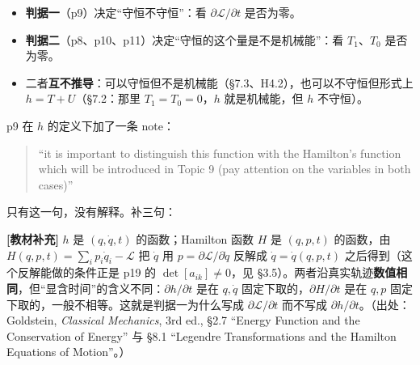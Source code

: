 \documentclass[11pt]{ctexart}
\begin{document}
\begin{itemize}
\item \textbf{判据一}（p9）决定“守恒不守恒”：看 $\partial\mathcal{L}/\partial t$ 是否为零。
\item \textbf{判据二}（p8、p10、p11）决定“守恒的这个量是不是机械能”：看 $T_1$、$T_0$ 是否为零。
\item 二者\textbf{互不推导}：可以守恒但不是机械能（§7.3、H4.2），也可以不守恒但形式上 $h=T+U$（§7.2：那里 $T_1=T_0=0$，$h$ 就是机械能，但 $h$ 不守恒）。
\end{itemize}



p9 在 $h$ 的定义下加了一条 note：
\begin{quote}
“it is important to distinguish this function with the Hamilton's function which will be introduced in Topic 9 (pay attention on the variables in both cases)”
\end{quote}
只有这一句，没有解释。补三句：

\textbf{[教材补充]} $h$ 是 $(q,\dot q,t)$ 的函数；Hamilton 函数 $H$ 是 $(q,p,t)$ 的函数，由 $H(q,p,t)=\sum_i p_i\dot q_i-\mathcal{L}$ 把 $\dot q$ 用 $p=\partial\mathcal{L}/\partial\dot q$ 反解成 $\dot q=\dot q(q,p,t)$ 之后得到（这个反解能做的条件正是 p19 的 $\det[a_{ik}]\ne0$，见 §3.5）。两者沿真实轨迹\textbf{数值相同}，但“显含时间”的含义不同：$\partial h/\partial t$ 是在 $q,\dot q$ 固定下取的，$\partial H/\partial t$ 是在 $q,p$ 固定下取的，一般不相等。这就是判据一为什么写成 $\partial\mathcal{L}/\partial t$ 而不写成 $\partial h/\partial t$。（出处：Goldstein, \emph{Classical Mechanics}, 3rd ed., §2.7 “Energy Function and the Conservation of Energy” 与 §8.1 “Legendre Transformations and the Hamilton Equations of Motion”。）

\end{document}

